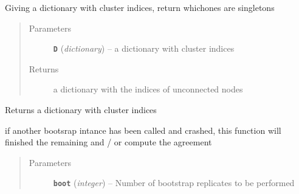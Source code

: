 \documentclass[letterpaper,10pt,english]{sphinxmanual}
\begin{document}
\begin{fulllineitems}
\begin{fulllineitems}
\label{Doc:Moduler.SupportClustering.filter_singletons}
Giving a dictionary with cluster indices, return whichones are singletons
\begin{quote}\begin{description}
\item[{Parameters}] \leavevmode
\textbf{\texttt{D}} (\emph{dictionary}) -- a dictionary with cluster indices

\item[{Returns}] \leavevmode
a dictionary with the indices of unconnected nodes

\end{description}\end{quote}

\end{fulllineitems}


\begin{fulllineitems}
\label{Doc:Moduler.SupportClustering.get_cluster_indices}
Returns a dictionary with cluster indices

\end{fulllineitems}


\begin{fulllineitems}
\label{Doc:Moduler.SupportClustering.if_bootfile}
if another bootsrap intance has been called and crashed, this function will finished
the remaining and / or compute the agreement
\begin{quote}\begin{description}
\item[{Parameters}] \leavevmode
\textbf{\texttt{boot}} (\emph{integer}) -- Number of bootstrap replicates to be performed

\end{description}\end{quote}

\end{fulllineitems}



\end{fulllineitems}
\end{document}
